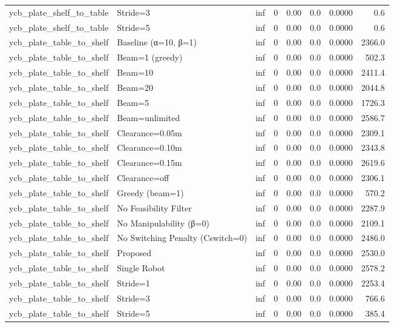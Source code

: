 \begin{table}[ht]
{\begin{tabular}{l l r r r r r r}
  ycb\_plate\_shelf\_to\_table & Stride=3 & inf & 0 & 0.00 & 0.0 & 0.0000 & 0.6 \\
  ycb\_plate\_shelf\_to\_table & Stride=5 & inf & 0 & 0.00 & 0.0 & 0.0000 & 0.6 \\
  ycb\_plate\_table\_to\_shelf & Baseline (α=10, β=1) & inf & 0 & 0.00 & 0.0 & 0.0000 & 2366.0 \\
  ycb\_plate\_table\_to\_shelf & Beam=1 (greedy) & inf & 0 & 0.00 & 0.0 & 0.0000 & 502.3 \\
  ycb\_plate\_table\_to\_shelf & Beam=10 & inf & 0 & 0.00 & 0.0 & 0.0000 & 2411.4 \\
  ycb\_plate\_table\_to\_shelf & Beam=20 & inf & 0 & 0.00 & 0.0 & 0.0000 & 2044.8 \\
  ycb\_plate\_table\_to\_shelf & Beam=5 & inf & 0 & 0.00 & 0.0 & 0.0000 & 1726.3 \\
  ycb\_plate\_table\_to\_shelf & Beam=unlimited & inf & 0 & 0.00 & 0.0 & 0.0000 & 2586.7 \\
  ycb\_plate\_table\_to\_shelf & Clearance=0.05m & inf & 0 & 0.00 & 0.0 & 0.0000 & 2309.1 \\
  ycb\_plate\_table\_to\_shelf & Clearance=0.10m & inf & 0 & 0.00 & 0.0 & 0.0000 & 2343.8 \\
  ycb\_plate\_table\_to\_shelf & Clearance=0.15m & inf & 0 & 0.00 & 0.0 & 0.0000 & 2619.6 \\
  ycb\_plate\_table\_to\_shelf & Clearance=off & inf & 0 & 0.00 & 0.0 & 0.0000 & 2306.1 \\
  ycb\_plate\_table\_to\_shelf & Greedy (beam=1) & inf & 0 & 0.00 & 0.0 & 0.0000 & 570.2 \\
  ycb\_plate\_table\_to\_shelf & No Feasibility Filter & inf & 0 & 0.00 & 0.0 & 0.0000 & 2287.9 \\
  ycb\_plate\_table\_to\_shelf & No Manipulability (β=0) & inf & 0 & 0.00 & 0.0 & 0.0000 & 2109.1 \\
  ycb\_plate\_table\_to\_shelf & No Switching Penalty (Cswitch=0) & inf & 0 & 0.00 & 0.0 & 0.0000 & 2486.0 \\
  ycb\_plate\_table\_to\_shelf & Proposed & inf & 0 & 0.00 & 0.0 & 0.0000 & 2530.0 \\
  ycb\_plate\_table\_to\_shelf & Single Robot & inf & 0 & 0.00 & 0.0 & 0.0000 & 2578.2 \\
  ycb\_plate\_table\_to\_shelf & Stride=1 & inf & 0 & 0.00 & 0.0 & 0.0000 & 2253.4 \\
  ycb\_plate\_table\_to\_shelf & Stride=3 & inf & 0 & 0.00 & 0.0 & 0.0000 & 766.6 \\
  ycb\_plate\_table\_to\_shelf & Stride=5 & inf & 0 & 0.00 & 0.0 & 0.0000 & 385.4 \\
\bottomrule
\end{tabular}}
\end{table}